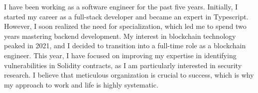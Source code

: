 

\begin{cvparagraph}
  I have been working as a software engineer for the past five years. Initially, I started my career as a full-stack developer and became an expert in Typescript. However, I soon realized the need for specialization, which led me to spend two years mastering backend development. My interest in blockchain technology peaked in 2021, and I decided to transition into a full-time role as a blockchain engineer. This year, I have focused on improving my expertise in identifying vulnerabilities in Solidity contracts, as I am particularly interested in security research. I believe that meticulous organization is crucial to success, which is why my approach to work and life is highly systematic.
\end{cvparagraph}
